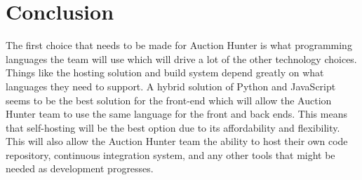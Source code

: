 \documentclass[onecolumn, draftclsnofoot,10pt, compsoc]{IEEEtran}
\begin{document}
\section{Conclusion}
The first choice that needs to be made for Auction Hunter is what programming languages the team will use which will drive a lot of the other technology choices. Things like the hosting solution and build system depend greatly on what languages they need to support. A hybrid solution of Python and JavaScript seems to be the best solution for the front-end which will allow the Auction Hunter team to use the same language for the front and back ends. This means that self-hosting will be the best option due to its affordability and flexibility. This will also allow the Auction Hunter team the ability to host their own code repository, continuous integration system, and any other tools that might be needed as development progresses. 

\newpage



\end{document}
